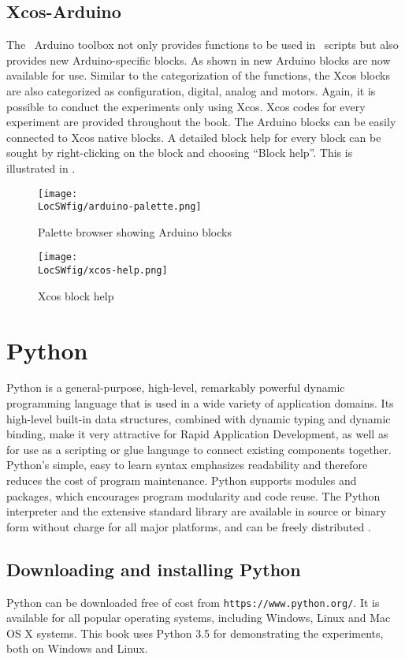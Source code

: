 \subsection{Xcos-Arduino}
The \scilab\ Arduino toolbox not only provides functions to be used in
\scilab\ scripts but also provides new Arduino-specific blocks. As
shown in  new Arduino blocks are now available
for use.  Similar to the categorization of the functions, the Xcos
blocks are also categorized as configuration, digital, analog and
motors. Again, it is possible to conduct the experiments only using
Xcos. Xcos codes for every experiment are provided throughout the
book. The Arduino blocks can be easily connected to Xcos native
blocks. A detailed block help for every block can be sought by right-clicking on the block and choosing ``Block help''. This is illustrated
in .

\begin{figure}
      \centering
      \texttt{[image: \\LocSWfig/arduino-palette.png]}
      \caption{Palette browser showing Arduino blocks}
      \label{arduino-palette}
\end{figure}

\begin{figure}
      \centering
      \texttt{[image: \\LocSWfig/xcos-help.png]}
      \caption{Xcos block help}
      \label{blk-help}
\end{figure}

\section{Python}
\label{sec:python-start}
Python is a general-purpose, high-level, remarkably powerful dynamic programming language 
that is used in a wide variety of application domains. Its high-level built-in data structures, 
combined with dynamic typing and dynamic binding, make it very attractive for Rapid Application Development, 
as well as for use as a scripting or glue language to connect existing components together. 
Python's simple, easy to learn syntax emphasizes readability and therefore reduces the cost of program maintenance. 
Python supports modules and packages, which encourages program modularity and code reuse. 
The Python interpreter and the extensive standard library are available in source or binary form without 
charge for all major platforms, and can be freely distributed \cite{python-ref}.


\subsection{Downloading and installing Python}\label{python-installation}
Python can be downloaded free of cost from {\tt https://www.python.org/}. It is
available for all popular operating systems, including Windows, Linux
and Mac OS X systems.  This book uses Python 3.5 for demonstrating
the experiments, both on Windows and Linux.

